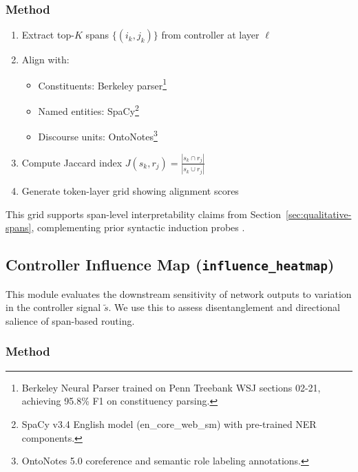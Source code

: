 \subsubsection*{Method}

\begin{enumerate}[leftmargin=1.5em]
  \item Extract top-$K$ spans \( \{(i_k, j_k)\} \) from controller at layer \( \ell \)
  \item Align with:
  \begin{itemize}
    \item Constituents: Berkeley parser\footnote{Berkeley Neural Parser trained on Penn Treebank WSJ sections 02-21, achieving 95.8\% F1 on constituency parsing.} \cite{kitaev2018constituency}
    \item Named entities: SpaCy\footnote{SpaCy v3.4 English model (en\_core\_web\_sm) with pre-trained NER components.} \cite{honnibal2017spacy}
    \item Discourse units: OntoNotes\footnote{OntoNotes 5.0 coreference and semantic role labeling annotations.} \cite{weischedel2013ontonotes}
  \end{itemize}
  \item Compute Jaccard index \( J(s_k, r_j) = \frac{|s_k \cap r_j|}{|s_k \cup r_j|} \)
  \item Generate token-layer grid showing alignment scores
\end{enumerate}

This grid supports span-level interpretability claims from Section~\ref{sec:qualitative-spans}, complementing prior syntactic induction probes \cite{kim2019unsupervised}.

\subsection{Controller Influence Map (\texttt{influence\_heatmap})}
\label{sec:vis-influence}

This module evaluates the downstream sensitivity of network outputs to variation in the controller signal \( \tilde{s} \). We use this to assess disentanglement and directional salience of span-based routing.

\subsubsection*{Method}

